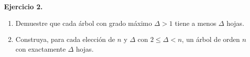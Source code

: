 \textbf{Ejercicio 2.} 
\begin{enumerate}[label = \textbf{\alph*)}]
    \item Demuestre que cada árbol con grado máximo $\Delta > 1$ tiene a 
    menos $\Delta$ hojas.
    \item Construya, para cada elección de $n$ y $\Delta$ con 
    $2\leq \Delta < n$, un árbol de orden $n$ con exactamente $\Delta$ hojas.
\end{enumerate}